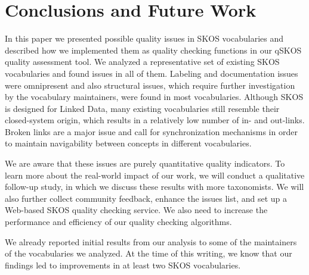 \section{Conclusions and Future Work}\label{sec:conclusions}

In this paper we presented possible quality issues in SKOS vocabularies and described how we implemented them as quality checking functions in our qSKOS quality assessment tool. We analyzed a representative set of existing SKOS vocabularies and found  issues in all of them. Labeling and documentation issues were omnipresent and also structural issues, which require further investigation by the vocabulary maintainers, were found in most vocabularies. Although SKOS is designed for Linked Data, many existing vocabularies still resemble their closed-system origin, which results in a relatively low number of in- and out-links. Broken links are a major issue and call for synchronization mechanisms in order to maintain navigability between concepts in different vocabularies.

We are aware that these issues are purely quantitative quality indicators. To learn more about the real-world impact of our work, we will conduct a qualitative follow-up study, in which we discuss these results with more taxonomists. We will also further collect community feedback, enhance the issues list, and set up a Web-based SKOS quality checking service. We also need to increase the performance and efficiency of our quality checking algorithms.

We already reported initial results from our analysis to some of the maintainers of the vocabularies we analyzed. At the time of this writing, we know that our findings led to improvements in at least two SKOS vocabularies.
